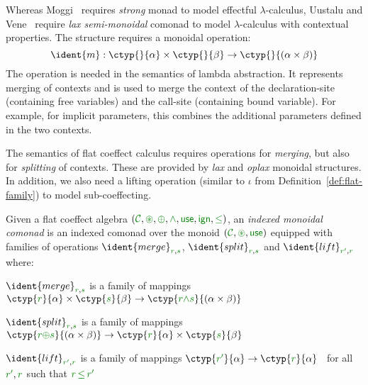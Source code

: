 Whereas Moggi~\cite{monad-notions} requires \emph{strong} monad to model effectful $\lambda$-calculus, 
Uustalu and Vene~\cite{comonads-notions} require \emph{lax semi-monoidal} comonad to model 
$\lambda$-calculus with contextual properties. The structure requires a monoidal operation:
%
\begin{equation*}
\ident{m} : \ctyp{}{\alpha} \times \ctyp{}{\beta} \rightarrow \ctyp{}{(\alpha \times \beta)}
\end{equation*}
%
The  operation is needed in the semantics of lambda abstraction. It represents merging of 
contexts and is used to merge the context of the declaration-site (containing free variables)
and the call-site (containing bound variable). For example, for implicit parameters, this combines
the additional parameters defined in the two contexts.

The semantics of flat coeffect calculus requires operations for \emph{merging}, but also for
\emph{splitting} of contexts. These are provided by \emph{lax} and \emph{oplax} monoidal 
structures. In addition, we also need a lifting operation (similar to $\iota$ from 
Definition~\ref{def:flat-family}) to model sub-coeffecting.

\begin{definition}
Given a flat coeffect algebra $(\C, \cseq, \cpar, \czip, \cunit, \czero, \cleq)$,
an \emph{indexed monoidal comonad} is an indexed comonad over the monoid $(\C, \cseq, \cunit)$
equipped with families of operations $\ident{merge}_{\cclrd{r},\cclrd{s}}$, $\ident{split}_{\cclrd{r},\cclrd{s}}$ 
and $\ident{lift}_{\cclrd{r'},\cclrd{r}}$ where:
%
\begin{compactitem}
\item $\ident{merge}_{\cclrd{r},\cclrd{s}}$ is a family of mappings
  $\ctyp{\cclrd{r}}{\alpha} \times \ctyp{\cclrd{s}}{\beta} \rightarrow \ctyp{\cclrd{r}\czip\cclrd{s}}{(\alpha \times \beta)}$
\item $\ident{split}_{\cclrd{r},\cclrd{s}}$ is a family of mappings
  $\ctyp{\cclrd{r}\cpar\cclrd{s}}{(\alpha \times \beta)} \rightarrow \ctyp{\cclrd{r}}{\alpha} \times \ctyp{\cclrd{s}}{\beta}$
\item $\ident{lift}_{\cclrd{r'},\cclrd{r}}$ is a family of mappings
  $\ctyp{\cclrd{r'}}{\alpha} \rightarrow \ctyp{\cclrd{r}}{\alpha}$~ for all $\cclrd{r'}, \cclrd{r}$ such that $\cclrd{r}\,\cleq\,\cclrd{r'}$
\end{compactitem}
%
%
%
%
\end{definition}

